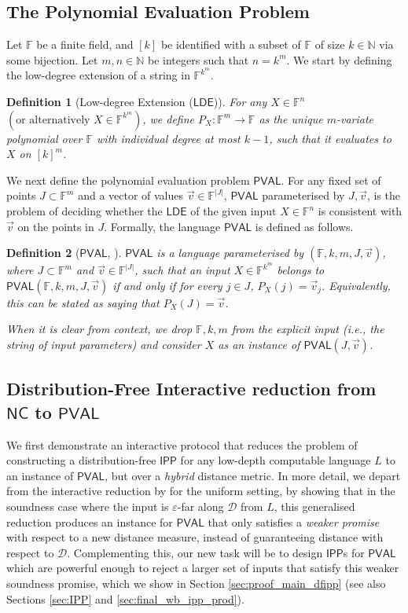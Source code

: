 \documentclass[10pt,a4paper]{article}
\newtheorem{definition}{Definition}[section]
\newcommand{\NC}{\mathsf{NC}}
\newcommand{\PVAL}{\mathsf{PVAL}}
\newcommand{\IPP}{\mathsf{IPP}}
\newcommand{\LDE}{\mathsf{LDE}}
\newcommand{\F}{\mathbb{F}}
\newcommand{\N}{\mathbb{N}}
\newcommand{\sD}{\mathcal{D}}
\begin{document}
\subsection{The Polynomial Evaluation Problem}
\label{sec:pval_def}
Let $\F$ be a finite field, and $[k]$ be identified with a subset of $\F$ of size $k\in \N$ via some bijection. Let $m,n \in \N$ be integers such that $n=k^{m}$. We start by defining the low-degree extension of a string in $\F^{k^m}$.
\begin{definition}[Low-degree Extension ($\LDE$)]
\label{def:lde}
For any $X \in \F^n$ $\left( \text{or alternatively } X \in \F^{k^{m}} \right)$, we define $P_X : \F^m \rightarrow \F$ as the unique $m$-variate polynomial over $\F$ with individual degree at most $k - 1$, such that it evaluates to $X$ on $[k]^{m}$.
\end{definition}

We next define the polynomial evaluation problem $\PVAL$. For any fixed set of points $J \subset \F^m$ and a vector of values $\Vec{v} \in \F^{\vert J \vert}$, $\PVAL$ parameterised by $J,\Vec{v}$, is the problem of deciding whether the $\LDE$ of the given input $X \in \F^n$ is consistent with $\Vec{v}$ on the points in $J$. Formally, the language $\PVAL$ is defined as follows.

\begin{definition}[$\PVAL$, \cite{RVW}]
\label{def:pval}
$\PVAL$ is a language parameterised by $(\F,k,m,J,\Vec{v})$, where $J \subset \F^m$ and $\Vec{v} \in \F^{\vert J \vert}$, such that an input $X \in \F^{k^m}$ belongs to $\PVAL(\F,k,m,J,\Vec{v})$ if and only if for every $j\in J$, $P_X(j)=\vec{v}_{j}$. Equivalently, this can be stated as saying that $P_X(J) = \Vec{v}$. 

When it is clear from context, we drop $\F,k,m$ from the explicit input (i.e., the string of input parameters) and consider $X$ as an instance of $\PVAL(J,\Vec{v})$.
\end{definition}

\subsection{Distribution-Free Interactive reduction from \texorpdfstring{$\NC$}{} to \texorpdfstring{$\PVAL$}{}}
\label{sec:NCPVAL}
We first demonstrate an interactive protocol that reduces the problem of constructing a distribution-free $\IPP$ for any low-depth computable language $L$ to an instance of $\PVAL$, but over a \textit{hybrid} distance metric. In more detail, we depart from the interactive reduction by \cite{RVW} for the uniform setting, by showing that in the soundness case where the input is $\varepsilon$-far along $\sD$ from $L$, this generalised reduction produces an instance for $\PVAL$ that only satisfies a \textit{weaker promise} with respect to a new distance measure, instead of guaranteeing distance with respect to $\sD$. Complementing this, our new task will be to design $\IPP$s for $\PVAL$ which are powerful enough to reject a larger set of inputs that satisfy this weaker soundness promise, which we show in Section \ref{sec:proof_main_dfipp} (see also Sections \ref{sec:IPP} and \ref{sec:final_wb_ipp_prod}).
\end{document}
